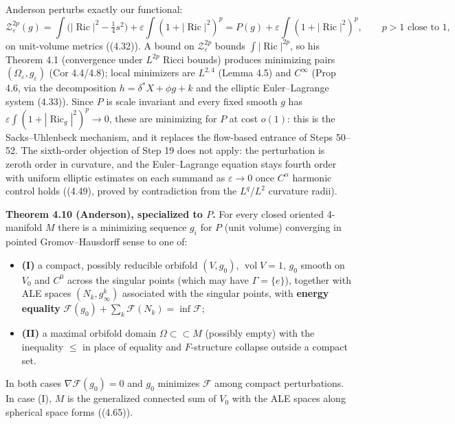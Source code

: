 \documentclass[
  10pt,
]{report}
\providecommand{\tightlist}{%
  \setlength{\itemsep}{0pt}\setlength{\parskip}{0pt}}
\begin{document}
Anderson perturbs exactly our functional: \[
\mathcal Z^{2p}_\varepsilon(g)=\int\Big(|\operatorname{Ric}|^2-\tfrac14s^2\Big)+\varepsilon\int(1+|\operatorname{Ric}|^2)^p
=P(g)+\varepsilon\int(1+|\operatorname{Ric}|^2)^p ,\qquad p>1 \text{ close to }1,
\] on unit-volume metrics ((4.32)). A bound on
\(\mathcal Z^{2p}_\varepsilon\) bounds
\(\int|\operatorname{Ric}|^{2p}\), so his Theorem 4.1 (convergence under
\(L^{2p}\) Ricci bounds) produces minimizing pairs
\((\Omega_\varepsilon,g_\varepsilon)\) (Cor 4.4/4.8); local minimizers
are \(L^{2,4}\) (Lemma 4.5) and \(C^\infty\) (Prop 4.6, via the
decomposition \(h=\delta^*X+\phi g+k\) and the elliptic Euler--Lagrange
system (4.33)). Since \(P\) is scale invariant and every fixed smooth
\(g\) has \(\varepsilon\int(1+|\operatorname{Ric}_g|^2)^p\to0\), these
are minimizing for \(P\) at cost \(o(1)\): this is the Sacks--Uhlenbeck
mechanism, and it replaces the flow-based entrance of Steps 50--52. The
sixth-order objection of Step 19 does not apply: the perturbation is
zeroth order in curvature, and the Euler--Lagrange equation stays fourth
order with uniform elliptic estimates on each summand as
\(\varepsilon\to0\) once \(C^\alpha\) harmonic control holds ((4.49),
proved by contradiction from the \(L^q\)/\(L^2\) curvature radii).

\textbf{Theorem 4.10 (Anderson), specialized to \(P\).} For every closed
oriented 4-manifold \(M\) there is a minimizing sequence \(g_i\) for
\(P\) (unit volume) converging in pointed Gromov--Hausdorff sense to one
of:

\begin{itemize}
\tightlist
\item
  \textbf{(I)} a compact, possibly reducible orbifold \((V,g_0)\),
  \(\operatorname{vol}V=1\), \(g_0\) smooth on \(V_0\) and \(C^0\)
  across the singular points (which may have \(\Gamma=\{e\}\)), together
  with ALE spaces \((N_k,g^k_\infty)\) associated with the singular
  points, with \textbf{energy equality}
  \(\mathcal F(g_0)+\sum_k\mathcal F(N_k)=\inf\mathcal F\);
\item
  \textbf{(II)} a maximal orbifold domain \(\Omega\subset\subset M\)
  (possibly empty) with the inequality \(\le\) in place of equality and
  \(F\)-structure collapse outside a compact set.
\end{itemize}

In both cases \(\nabla\mathcal F(g_0)=0\) and \(g_0\) minimizes
\(\mathcal F\) among compact perturbations. In case (I), \(M\) is the
generalized connected sum of \(V_0\) with the ALE spaces along spherical
space forms ((4.65)).
\end{document}
